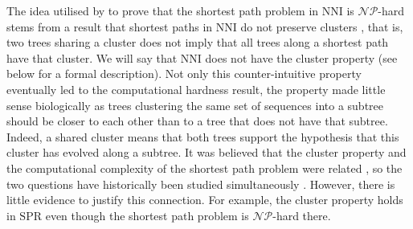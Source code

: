\documentclass[11pt]{amsart}
\newcommand{\nni}{\mathrm{NNI}}
\newcommand{\spr}{\mathrm{SPR}}
\newcommand{\np}{\mathcal{NP}}
\newcommand{\summary}[1]{} %
\begin{document}
\summary{Historically, the complexity question was following hand in hand with the cluster property -- more history plus biological relevance of the property.}
The idea utilised by \textcite{Dasgupta2000-xa} to prove that the shortest path problem in $\nni$ is $\np$-hard stems from a result that shortest paths in $\nni$ do not preserve clusters \autocite{Li1996-zw}, that is, two trees sharing a cluster does not imply that all trees along a shortest path have that cluster.
We will say that $\nni$ does not have the cluster property (see below for a formal description).
Not only this counter-intuitive property eventually led to the computational hardness result, the property made little sense biologically as trees clustering the same set of sequences into a subtree should be closer to each other than to a tree that does not have that subtree.
Indeed, a shared cluster means that both trees support the hypothesis that this cluster has evolved along a subtree.
It was believed that the cluster property and the computational complexity of the shortest path problem were related \autocite{Li1996-zw}, so the two questions have historically been studied simultaneously \autocite{Dasgupta2000-xa}.
However, there is little evidence to justify this connection.
For example, the cluster property holds in $\spr$ even though the shortest path problem is $\np$-hard there.
\end{document}
